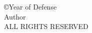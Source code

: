 
\begin{center}
\begin{singlespace}
\copyright Year of Defense\\
Author\\
ALL RIGHTS RESERVED
\end{singlespace}
\end{center}

\clearpage
